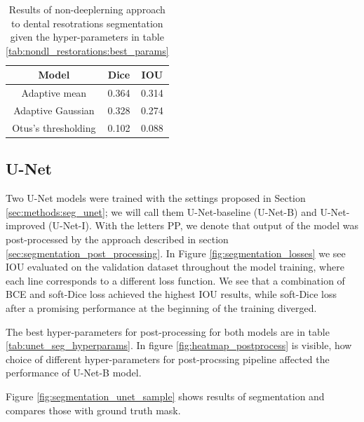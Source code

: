 \begin{table}[H]
    \centering
    \begin{tabular}{|c|c|c|}
        \hline
        Model               & Dice  & IOU   \\ \hline
        Adaptive mean       & 0.364 & 0.314 \\ \hline
        Adaptive Gaussian   & 0.328 & 0.274 \\ \hline
        Otus's thresholding & 0.102 & 0.088 \\ \hline
    \end{tabular}
    \caption{Results of non-deeplerning approach to dental resotrations segmentation given the hyper-parameters in table \ref{tab:nondl_restorations:best_params}}
    \label{tab:nondl_results}
\end{table}



\subsection{U-Net}
Two U-Net models were trained with the settings proposed in Section \ref{sec:methods:seg_unet}; we will call them U-Net-baseline (U-Net-B) and U-Net-improved (U-Net-I). With the letters PP, we denote that output of the model was post-processed by the approach described in section \ref{sec:segmentation_post_processing}.
In Figure \ref{fig:segmentation_losses} we see IOU evaluated on the validation dataset throughout the model training, where each line corresponds to a different loss function. We see that a combination of BCE and soft-Dice loss achieved the highest IOU results, while soft-Dice loss after a promising performance at the beginning of the training diverged.

The best hyper-parameters for post-processing for both models are in table \ref{tab:unet_seg_hyperparams}. In figure \ref{fig:heatmap_postprocess} is visible, how choice of different hyper-parameters for post-procssing pipeline affected the performance of U-Net-B model.

Figure \ref{fig:segmentation_unet_sample} shows results of segmentation and compares those with ground truth mask.

